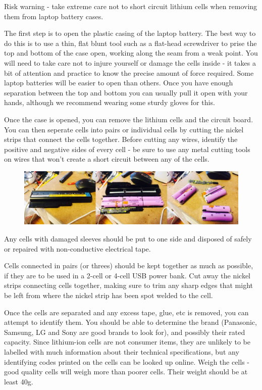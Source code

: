 \documentclass{article}
\theoremstyle{definition}
\theoremstyle{definition}
\theoremstyle{remark}
\begin{document}
    Risk warning - take extreme care not to short circuit lithium cells when removing them from laptop battery cases. 

    The first step is to open the plastic casing of the laptop battery. The best way to do this is to use a thin, flat blunt tool such as a flat-head screwdriver to prise the top and bottom of the case open, working along the seam from a weak point. You will need to take care not to injure yourself or damage the cells inside - it takes a bit of attention and practice to know the precise amount of force required. Some laptop batteries will be easier to open than others. Once you have enough separation between the top and bottom you can usually pull it open with your hands, although we recommend wearing some sturdy gloves for this.

    Once the case is opened, you can remove the lithium cells and the circuit board. You can then seperate cells into pairs or individual cells by cutting the nickel strips that connect the cells together. Before cutting any wires, identify the positive and negative sides of every cell - be sure to use any metal cutting tools on wires that won’t create a short circuit between any of the cells.

    \begin{figure}[!ht]
      \centering
      \includegraphics[width=0.75\paperwidth]{Images/image_5_3_(battery_disassembly).png}
    \end{figure}

    Any cells with damaged sleeves should be put to one side and disposed of safely or repaired with non-conductive electrical tape.

    Cells connected in pairs (or threes) should be kept together as much as possible, if they are to be used in a 2-cell or 4-cell USB power bank. Cut away the nickel strips connecting cells together, making sure to trim any sharp edges that might be left from where the nickel strip has been spot welded to the cell.

    Once the cells are separated and any excess tape, glue, etc is removed, you can attempt to identify them. You should be able to determine the brand (Panasonic, Samsung, LG and Sony are good brands to look for), and possibly their rated capacity. Since lithium-ion cells are not consumer items, they are unlikely to be labelled with much information about their technical specifications, but any identifying codes printed on the cells can be looked up online. Weigh the cells - good quality cells will weigh more than poorer cells. Their weight should be at least 40g.
\end{document}
